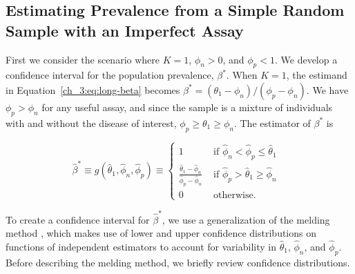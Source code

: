 \subsection{Estimating Prevalence from a Simple Random Sample with an Imperfect Assay}
\label{ch_3:sec:srs-imperfect}

First we consider the scenario where \( K = 1 \), \( \phi_n > 0 \), and \( \phi_p < 1 \).
We develop a confidence interval for the population prevalence, \( \beta^* \).
When \( K = 1 \), the estimand in Equation~\ref{ch_3:eq:long-beta} becomes $\beta^* = (\theta_1 - \phi_n)/(\phi_p-\phi_n)$. We have $\phi_p > \phi_n$ for any useful assay, and since the sample is a mixture of individuals with and without the disease of interest, $\phi_p \geq \theta_1 \geq \phi_n$. The estimator of $\beta^*$ is

\begin{equation}
\hat{\beta}^* \equiv
g(\hat{\theta}_1, \hat{\phi}_n, \hat{\phi}_p)
\equiv
\left\{
\begin{array}{ll}
1 & \mbox{ if $\hat{\phi}_n < \hat{\phi}_p \leq \hat{\theta}_1$ }  \\
\frac{\hat{\theta}_1 - \hat{\phi}_n}{\hat{\phi}_p - \hat{\phi}_n} &
\mbox{ if $\hat{\phi}_p > \hat{\theta}_1 \geq \hat{\phi}_n$ } \\
0 & \mbox{ otherwise.}
\end{array}
\right.
\label{ch_3:eq:srs-beta-est}
\end{equation}



To create a confidence interval for \( \hat{\beta}^* \), we use a generalization of the melding method \citep{FayP:2015}, which makes use of lower and upper confidence distributions on functions of independent estimators to account for variability in \( \hat{\theta}_1 \), \( \hat{\phi}_n \), and \( \hat{\phi}_p \).
Before describing the melding method, we briefly review confidence distributions.


